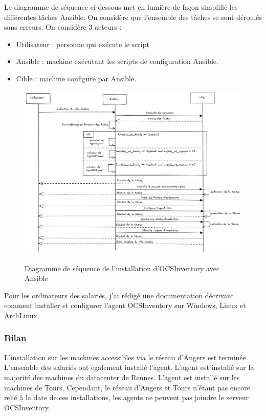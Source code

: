 \documentclass[12pt]{article}
\begin{document}
Le diagramme de séquence ci-dessous met en lumière de façon simplifié les différentes tâches Ansible. On considère que l'ensemble des tâches se sont déroulés sans erreurs.
On considère 3 acteurs :
\begin{itemize}
    \item Utilisateur : personne qui exécute le script
    \item Ansible : machine exécutant les scripts de configuration Ansible.
    \item Cible : machine configuré par Ansible.
\end{itemize}

\newpage
\begin{figure}[!ht]
    \centering
    \includegraphics[width=\textwidth]{src/Ansible OCS.png}
    \label{fig:ansible_ocs}
    \caption{Diagramme de séquence de l'installation d'OCSInventory avec Ansible}
\end{figure}

Pour les ordinateurs des salariés, j'ai rédigé une documentation décrivant comment installer et configurer l'agent OCSInventory sur Windows, Linux et ArchLinux.

\subsubsection{Bilan}
L'installation sur les machines accessibles via le réseau d'Angers est terminée.
L'ensemble des salariés ont également installé l'agent.
L'agent est installé sur la majorité des machines du datacenter de Rennes.
L'agent est installé sur les machines de Tours. 
Cependant, le réseau d'Angers et Tours n'étant pas encore relié à la date de ces installations, les agents ne peuvent pas joindre le serveur OCSInventory.
\end{document}
